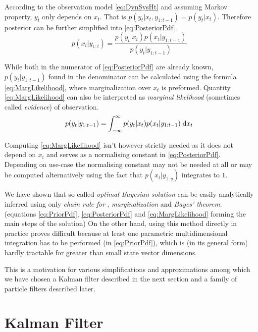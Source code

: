 According to the observation model \eqref{eq:DynSysHt} and assuming Markov property, \(y_t\) only
depends on \(x_t\). That is \(p(y_t | x_t, y_{1:t-1}) = p(y_t | x_t)\). Therefore posterior
{\pdf} can be further simplified into \eqref{eq:PosteriorPdf}.
\begin{equation} \label{eq:PosteriorPdf}
	p(x_t | y_{1:t}) = \frac{p(y_t | x_t) p(x_t | y_{1:t-1})}{p(y_t | y_{1:t-1})}
\end{equation}

While both {\pdfs} in the numerator of \eqref{eq:PosteriorPdf} are already known, \(p(y_t|y_{1:t-1})\)
found in the denominator can be calculated using the formula \eqref{eq:MargLikelihood}, where
marginalization over \(x_t\) is preformed. Quantity \eqref{eq:MargLikelihood} can also be interpreted as
\emph{marginal likelihood} (sometimes called \emph{evidence}) of observation.~\cite{Smi:10}
\begin{equation} \label{eq:MargLikelihood}
	p(y_t | y_{1:t-1}) = \int_{-\infty}^{\infty} p(y_t | x_t) p(x_t | y_{1:t-1}) \; \mathrm{d}x_{t}
\end{equation}

Computing \eqref{eq:MargLikelihood} isn't however strictly needed as it does not depend on \(x_t\) and
serves as a normalising constant in \eqref{eq:PosteriorPdf}. Depending on use-case the normalising
constant may not be needed at all or may be computed alternatively using the fact that \(p(x_t | y_{1:y})\)
integrates to \(1\).

We have shown that so called \emph{optimal Bayesian solution}\cite{AruMasGor:02} can be easily
analytically inferred using only \emph{chain rule for {\pdfs}}, \emph{marginalization} and
\emph{Bayes' theorem}. (equations \eqref{eq:PriorPdf}, \eqref{eq:PosteriorPdf} and
\eqref{eq:MargLikelihood} forming the main steps of the solution) On the other hand, using this
method directly in practice proves difficult because at least one parametric multidimensional
integration has to be performed (in \eqref{eq:PriorPdf}), which is (in its general form) hardly
tractable for greater than small state vector dimensions.

This is a motivation for various simplifications and approximations among which we have chosen
a Kalman filter described in the next section and a family of particle filters described later.

\section{Kalman Filter}

